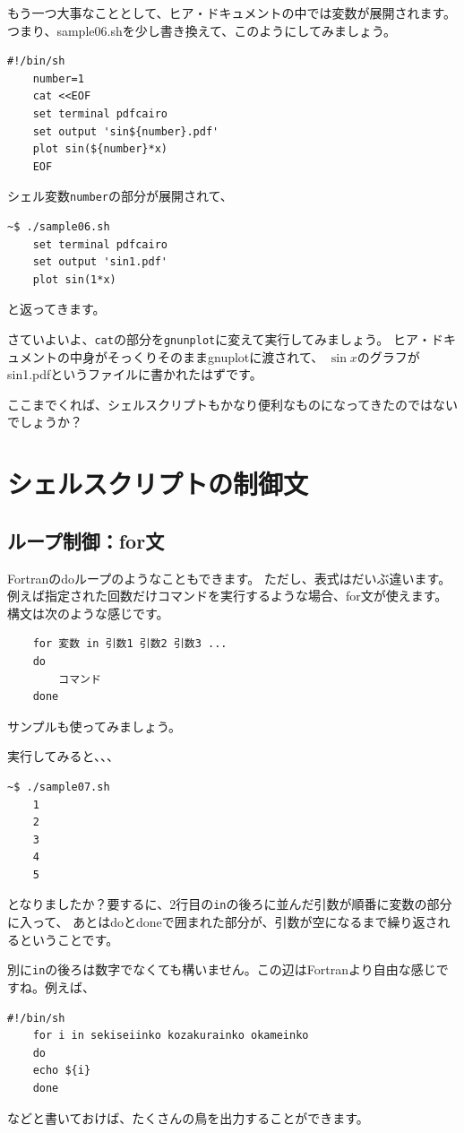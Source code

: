 \documentclass[a4j]{ltjreport}
\begin{document}
    もう一つ大事なこととして、ヒア・ドキュメントの中では変数が展開されます。
    つまり、sample06.shを少し書き換えて、このようにしてみましょう。
    \begin{lstlisting}[caption=sample06.sh 改]
    #!/bin/sh
    number=1
    cat <<EOF
    set terminal pdfcairo
    set output 'sin${number}.pdf'
    plot sin(${number}*x)
    EOF
    \end{lstlisting}
    シェル変数\texttt{number}の部分が展開されて、
    \begin{lstlisting}[numbers=none]
    ~$ ./sample06.sh 
    set terminal pdfcairo
    set output 'sin1.pdf'
    plot sin(1*x)
    \end{lstlisting}
    と返ってきます。

    さていよいよ、\texttt{cat}の部分を\texttt{gnunplot}に変えて実行してみましょう。
    ヒア・ドキュメントの中身がそっくりそのままgnuplotに渡されて、
    $\sin x$のグラフがsin1.pdfというファイルに書かれたはずです。

    ここまでくれば、シェルスクリプトもかなり便利なものになってきたのではないでしょうか？

    \section{シェルスクリプトの制御文}

    \subsection{ループ制御：for文}
    Fortranのdoループのようなこともできます。
    ただし、表式はだいぶ違います。
    例えば指定された回数だけコマンドを実行するような場合、for文が使えます。
    構文は次のような感じです。
    \begin{lstlisting}
    for 変数 in 引数1 引数2 引数3 ...
    do
        コマンド
    done
    \end{lstlisting}
    サンプルも使ってみましょう。
    
    実行してみると、、、
    \begin{lstlisting}[numbers=none]
    ~$ ./sample07.sh 
    1
    2
    3
    4
    5
    \end{lstlisting}
    となりましたか？要するに、2行目の\texttt{in}の後ろに並んだ引数が順番に変数の部分に入って、
    あとはdoとdoneで囲まれた部分が、引数が空になるまで繰り返されるということです。

    別に\texttt{in}の後ろは数字でなくても構いません。この辺はFortranより自由な感じですね。例えば、
    \begin{lstlisting}[caption=sample07.sh 改]
    #!/bin/sh
    for i in sekiseiinko kozakurainko okameinko
    do
    echo ${i}
    done
    \end{lstlisting}
    などと書いておけば、たくさんの鳥を出力することができます。
\end{document}
